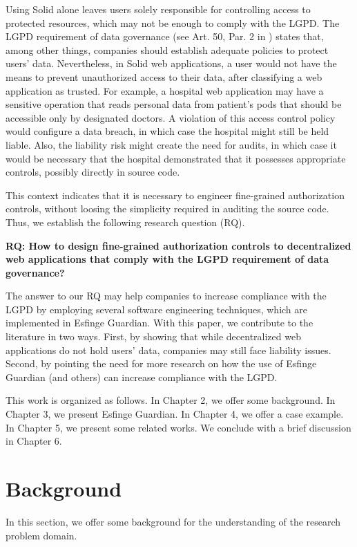 \documentclass[sigconf]{acmart}
\begin{document}
Using Solid alone leaves users solely responsible for controlling access to protected resources, which may not be enough to comply with the LGPD. The LGPD requirement of data governance (see Art. 50, Par. 2 in \cite{LGPD18}) states that, among other things, companies should establish adequate policies to protect users' data. Nevertheless, in Solid web applications, a user would not have the means to prevent unauthorized access to their data, after classifying a web application as trusted. For example, a hospital web application may have a sensitive operation that reads personal data from patient's pods that should be accessible only by designated doctors. A violation of this access control policy would configure a data breach, in which case the hospital might still be held liable. Also, the liability risk might create the need for audits, in which case it would be necessary that the hospital demonstrated that it possesses appropriate controls, possibly directly in source code.

This context indicates that it is necessary to engineer fine-grained authorization controls, without loosing the simplicity required in auditing the source code. Thus, we establish the following research question (RQ).

\vspace{0.15cm}
\noindent \textbf{RQ: How to design fine-grained authorization controls to decentralized web applications that comply with the LGPD requirement of data governance?}
\vspace{0.15cm}

The answer to our RQ may help companies to increase compliance with the LGPD by employing several software engineering techniques, which are implemented in Esfinge Guardian. With this paper, we contribute to the literature in two ways. First, by showing that while decentralized web applications do not hold users' data, companies may still face liability issues. Second, by pointing the need for more research on how the use of Esfinge Guardian (and others) can increase compliance with the LGPD.

This work is organized as follows. In Chapter 2, we offer some background. In Chapter 3, we present Esfinge Guardian. In Chapter 4, we offer a case example. In Chapter 5, we present some related works. We conclude with a brief discussion in Chapter 6.


\section{Background}
In this section, we offer some background for the understanding of the research problem domain.
\end{document}
